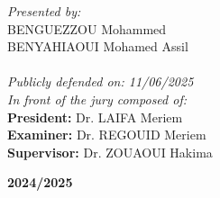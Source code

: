 \begin{spacing}{1.5}
  \noindent
  \textit{Presented by:} \\
  BENGUEZZOU Mohammed \\
  BENYAHIAOUI Mohamed Assil\\
  ~~\\
  \textit{Publicly defended on: 11/06/2025} \\
  \textit{In front of the jury composed of:} \\
  \textbf{President:} Dr. LAIFA Meriem \\
  \textbf{Examiner:} Dr. REGOUID Meriem \\
  \textbf{Supervisor:} Dr. ZOUAOUI Hakima \\
  \centerline{\textbf{2024/2025}}

\end{spacing}



